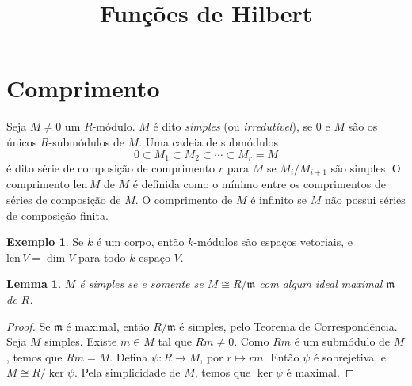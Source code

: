 \documentclass[12pt]{amsart}
\newcommand{\m}{\mathfrak m}
\newcommand{\len}{\mbox{len}\,}
\newtheorem{lemma}[theorem]{Lemma}
\theoremstyle{definition}
\newtheorem{example}[theorem]{Exemplo}
\begin{document}
\title{Funções de Hilbert}
\maketitle
\section{Comprimento}

Seja $M\neq 0$ um $R$-módulo. $M$ é dito \emph{simples} (ou \emph{irredutível}), se $0$ e $M$ são os únicos $R$-submódulos de $M$. 
Uma cadeia de submódulos 
\[
    0\subset M_1\subset M_2\subset \cdots \subset M_r=M
\]
é dito série de composição de comprimento $r$ para $M$ se $M_i/M_{i+1}$ são simples. 
O comprimento $\len M$ de $M$ é definida como o 
mínimo entre os comprimentos de séries de composição de $M$. O comprimento de $M$ é infinito se $M$ não possui 
séries de composição finita. 

\begin{example}
    Se $k$ é um corpo, então $k$-módulos são espaços vetoriais, e $\len V=\dim V$ para todo $k$-espaço $V$.
\end{example}

\begin{lemma}
    $M$ é simples se e somente se $M\cong R/\m$ com algum ideal maximal $\m$ de $R$.
\end{lemma}
\begin{proof}
    Se $\m$ é maximal, então $R/\m$ é simples, pelo Teorema de Correspondência. 
    Seja $M$ simples. Existe $m\in M$ tal que $Rm\neq 0$. Como $Rm$ é um submódulo de $M$, temos que 
    $Rm=M$.  Defina 
    $\psi: R\to M$, por $r\mapsto rm$. Então $\psi$ é sobrejetiva, e $M\cong R/\ker\psi$. Pela simplicidade 
    de $M$, temos que $\ker\psi$ é maximal.
\end{proof}
\end{document}
